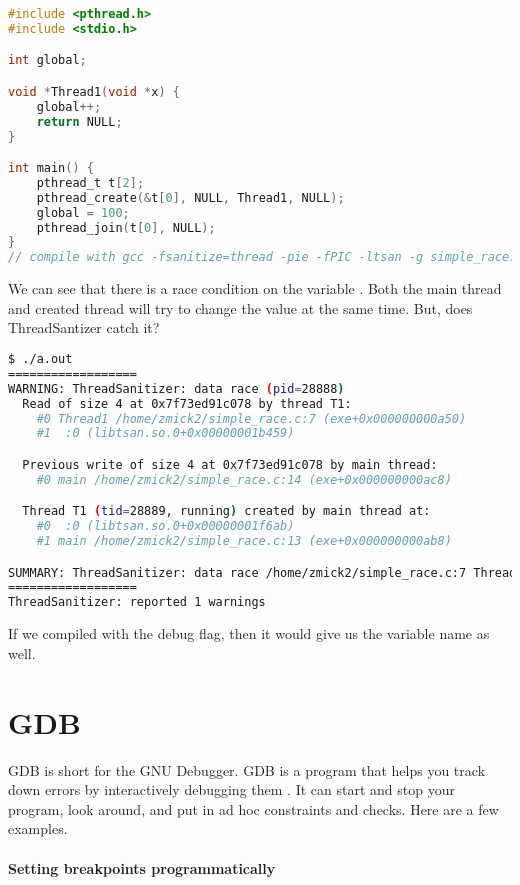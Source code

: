 \begin{lstlisting}[language=C]
#include <pthread.h>
#include <stdio.h>

int global;

void *Thread1(void *x) {
    global++;
    return NULL;
}

int main() {
    pthread_t t[2];
    pthread_create(&t[0], NULL, Thread1, NULL);
    global = 100;
    pthread_join(t[0], NULL);
}
// compile with gcc -fsanitize=thread -pie -fPIC -ltsan -g simple_race.c
\end{lstlisting}

We can see that there is a race condition on the variable .
Both the main thread and created thread will try to change the value at the same time.
But, does ThreadSantizer catch it?

\begin{lstlisting}[language=bash]
$ ./a.out
==================
WARNING: ThreadSanitizer: data race (pid=28888)
  Read of size 4 at 0x7f73ed91c078 by thread T1:
    #0 Thread1 /home/zmick2/simple_race.c:7 (exe+0x000000000a50)
    #1  :0 (libtsan.so.0+0x00000001b459)

  Previous write of size 4 at 0x7f73ed91c078 by main thread:
    #0 main /home/zmick2/simple_race.c:14 (exe+0x000000000ac8)

  Thread T1 (tid=28889, running) created by main thread at:
    #0  :0 (libtsan.so.0+0x00000001f6ab)
    #1 main /home/zmick2/simple_race.c:13 (exe+0x000000000ab8)

SUMMARY: ThreadSanitizer: data race /home/zmick2/simple_race.c:7 Thread1
==================
ThreadSanitizer: reported 1 warnings
\end{lstlisting}

If we compiled with the debug flag, then it would give us the variable name as well.

\section{GDB}

GDB is short for the GNU Debugger. GDB is a program that helps you track down errors by interactively debugging them \cite{gdb}. It can start and stop your program, look around, and put in ad hoc constraints and checks. Here are a few examples.

\paragraph{Setting breakpoints programmatically}

